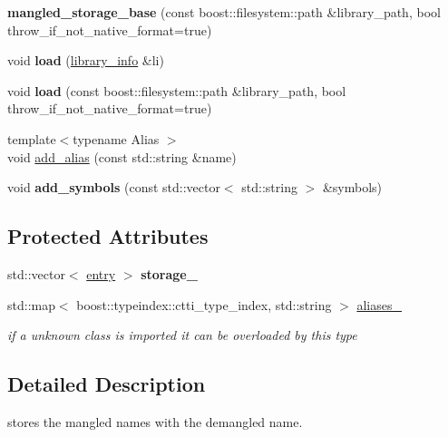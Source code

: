 \begin{DoxyCompactItemize}
{\bfseries mangled\+\_\+storage\+\_\+base} (const boost\+::filesystem\+::path \&library\+\_\+path, bool throw\+\_\+if\+\_\+not\+\_\+native\+\_\+format=true)
\item 
\mbox{\label{a01380_aa58fda526223482db4b592f8b868bbda}} 
void {\bfseries load} (\hyperlink{a01704}{library\+\_\+info} \&li)
\item 
\mbox{\label{a01380_a2ef7fb1ad3a8c5acb5eb8c27f387e629}} 
void {\bfseries load} (const boost\+::filesystem\+::path \&library\+\_\+path, bool throw\+\_\+if\+\_\+not\+\_\+native\+\_\+format=true)
\item 
{\footnotesize template$<$typename Alias $>$ }\\void \hyperlink{a01380_a34c6f14f96aef274e79f28dd4e1a10b2}{add\+\_\+alias} (const std\+::string \&name)
\item 
\mbox{\label{a01380_aecaea85b820805bcf0854edd632496a6}} 
void {\bfseries add\+\_\+symbols} (const std\+::vector$<$ std\+::string $>$ \&symbols)
\end{DoxyCompactItemize}
\subsection*{Protected Attributes}
\begin{DoxyCompactItemize}
\item 
\mbox{\label{a01380_a9d0573d5f1ac601b74fbbf50c374b7ac}} 
std\+::vector$<$ \hyperlink{a01384}{entry} $>$ {\bfseries storage\+\_\+}
\item 
\mbox{\label{a01380_a44440237a11d43b33ab3e678480bfb8e}} 
std\+::map$<$ boost\+::typeindex\+::ctti\+\_\+type\+\_\+index, std\+::string $>$ \hyperlink{a01380_a44440237a11d43b33ab3e678480bfb8e}{aliases\+\_\+}
\begin{DoxyCompactList}\small\item\em if a unknown class is imported it can be overloaded by this type \end{DoxyCompactList}\end{DoxyCompactItemize}


\subsection{Detailed Description}
stores the mangled names with the demangled name. 

